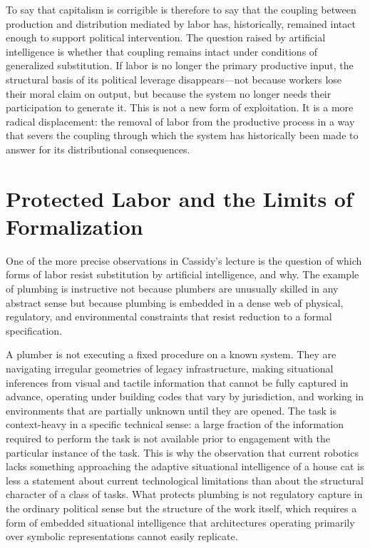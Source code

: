 \documentclass[11pt, a4paper]{article}
\theoremstyle{plain}
\theoremstyle{definition}
\begin{document}
To say that capitalism is corrigible is therefore to say that the coupling
between production and distribution mediated by labor has, historically,
remained intact enough to support political intervention. The question raised
by artificial intelligence is whether that coupling remains intact under
conditions of generalized substitution. If labor is no longer the primary
productive input, the structural basis of its political leverage
disappears---not because workers lose their moral claim on output, but because
the system no longer needs their participation to generate it. This is not a
new form of exploitation. It is a more radical displacement: the removal of
labor from the productive process in a way that severs the coupling through
which the system has historically been made to answer for its distributional
consequences.

\section{Protected Labor and the Limits of Formalization}

One of the more precise observations in Cassidy's lecture is the question of
which forms of labor resist substitution by artificial intelligence, and why.
The example of plumbing is instructive not because plumbers are unusually
skilled in any abstract sense but because plumbing is embedded in a dense web
of physical, regulatory, and environmental constraints that resist reduction
to a formal specification.

A plumber is not executing a fixed procedure on a known system. They are
navigating irregular geometries of legacy infrastructure, making situational
inferences from visual and tactile information that cannot be fully captured
in advance, operating under building codes that vary by jurisdiction, and
working in environments that are partially unknown until they are opened. The
task is context-heavy in a specific technical sense: a large fraction of the
information required to perform the task is not available prior to engagement
with the particular instance of the task. This is why the observation that
current robotics lacks something approaching the adaptive situational
intelligence of a house cat is less a statement about current technological
limitations than about the structural character of a class of tasks. What
protects plumbing is not regulatory capture in the ordinary political sense
but the structure of the work itself, which requires a form of embedded
situational intelligence that architectures operating primarily over symbolic
representations cannot easily replicate.
\end{document}

